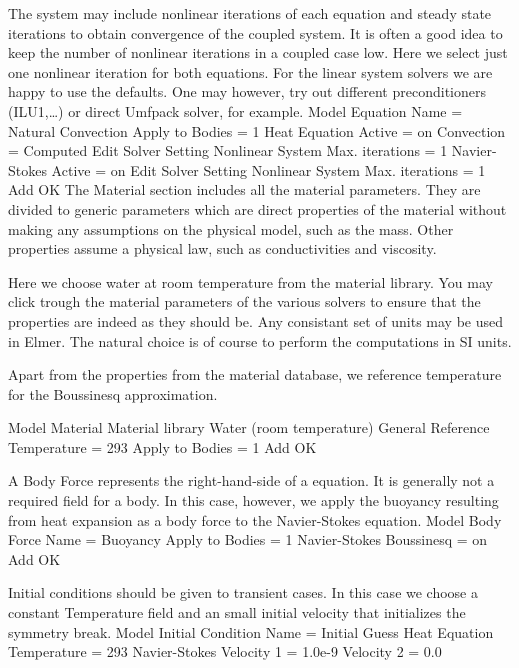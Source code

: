 The system may include nonlinear iterations of each equation and steady state iterations 
to obtain convergence of the coupled system. It is often a good idea to keep the number of 
nonlinear iterations in a coupled case low. Here we select just one nonlinear iteration
for both equations.
For the linear system solvers we are happy to use the defaults. One may however, try out different
preconditioners (ILU1,\ldots) or direct Umfpack solver, for example.
\ttbegin
Model
  Equation
    Name = Natural Convection
    Apply to Bodies = 1
    Heat Equation
      Active = on
      Convection = Computed
      Edit Solver Setting
        Nonlinear System
          Max. iterations = 1
    Navier-Stokes 
      Active = on
      Edit Solver Setting
        Nonlinear System
          Max. iterations = 1
    Add 
    OK
\ttend        
The Material section includes all the material parameters.
They are divided to generic parameters which are direct properties of the material
without making any assumptions on the physical model, such as the mass. Other properties assume
a physical law, such as conductivities and viscosity. 

Here we choose water at room temperature from the material library.
You may click trough the material parameters of the various solvers to ensure that
the properties are indeed as they should be. Any consistant set of units may be used in Elmer.
The natural choice is of course to perform the computations in SI units. 

Apart from the properties from the material database, we
reference temperature for the Boussinesq approximation.    

\ttbegin
Model
  Material
    Material library    
      Water (room temperature)
    General 
      Reference Temperature = 293
    Apply to Bodies = 1 
    Add
    OK
\ttend

A Body Force represents the right-hand-side of a equation. It is generally 
not a required field for a body. In this case, however, we apply the buoyancy resulting from
heat expansion as a body force to the Navier-Stokes equation.
\ttbegin
Model
  Body Force
    Name = Buoyancy
    Apply to Bodies = 1
    Navier-Stokes
      Boussinesq = on
    Add 
    OK
\ttend    

Initial conditions should be given to transient cases. In this case we choose a constant Temperature field
and an small initial velocity that initializes the symmetry break. 
\ttbegin
Model
  Initial Condition 
    Name = Initial Guess
    Heat Equation
      Temperature = 293
    Navier-Stokes
      Velocity 1 = 1.0e-9
      Velocity 2 = 0.0
\ttend

